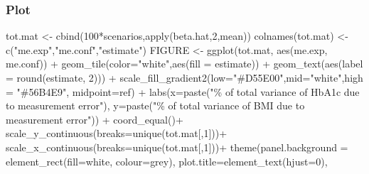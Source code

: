 \documentclass[
  letterpaper,
  DIV=11,
  numbers=noendperiod]{scrartcl}
\newenvironment{Shaded}{\begin{snugshade}}{\end{snugshade}}
\newcommand{\AttributeTok}[1]{\textcolor[rgb]{0.40,0.45,0.13}{#1}}
\newcommand{\DecValTok}[1]{\textcolor[rgb]{0.68,0.00,0.00}{#1}}
\newcommand{\FunctionTok}[1]{\textcolor[rgb]{0.28,0.35,0.67}{#1}}
\newcommand{\NormalTok}[1]{\textcolor[rgb]{0.00,0.23,0.31}{#1}}
\newcommand{\OtherTok}[1]{\textcolor[rgb]{0.00,0.23,0.31}{#1}}
\newcommand{\SpecialCharTok}[1]{\textcolor[rgb]{0.37,0.37,0.37}{#1}}
\newcommand{\StringTok}[1]{\textcolor[rgb]{0.13,0.47,0.30}{#1}}
\begin{document}
\hypertarget{plot}{%
\subsubsection{Plot}\label{plot}}

\begin{Shaded}
\begin{Highlighting}[]
\NormalTok{tot.mat }\OtherTok{\textless{}{-}} \FunctionTok{cbind}\NormalTok{(}\DecValTok{100}\SpecialCharTok{*}\NormalTok{scenarios,}\FunctionTok{apply}\NormalTok{(beta.hat,}\DecValTok{2}\NormalTok{,mean))}
\FunctionTok{colnames}\NormalTok{(tot.mat) }\OtherTok{\textless{}{-}} \FunctionTok{c}\NormalTok{(}\StringTok{"me.exp"}\NormalTok{,}\StringTok{"me.conf"}\NormalTok{,}\StringTok{"estimate"}\NormalTok{)}
\NormalTok{FIGURE }\OtherTok{\textless{}{-}} \FunctionTok{ggplot}\NormalTok{(tot.mat, }\FunctionTok{aes}\NormalTok{(me.exp, me.conf)) }\SpecialCharTok{+}
  \FunctionTok{geom\_tile}\NormalTok{(}\AttributeTok{color=}\StringTok{"white"}\NormalTok{,}\FunctionTok{aes}\NormalTok{(}\AttributeTok{fill =}\NormalTok{ estimate)) }\SpecialCharTok{+}
  \FunctionTok{geom\_text}\NormalTok{(}\FunctionTok{aes}\NormalTok{(}\AttributeTok{label =} \FunctionTok{round}\NormalTok{(estimate, }\DecValTok{2}\NormalTok{))) }\SpecialCharTok{+}
  \FunctionTok{scale\_fill\_gradient2}\NormalTok{(}\AttributeTok{low=}\StringTok{"\#D55E00"}\NormalTok{,}\AttributeTok{mid=}\StringTok{"white"}\NormalTok{,}\AttributeTok{high =} \StringTok{"\#56B4E9"}\NormalTok{, }\AttributeTok{midpoint=}\NormalTok{ref) }\SpecialCharTok{+}
  \FunctionTok{labs}\NormalTok{(}\AttributeTok{x=}\FunctionTok{paste}\NormalTok{(}\StringTok{"\% of total variance of HbA1c due to measurement error"}\NormalTok{),}
       \AttributeTok{y=}\FunctionTok{paste}\NormalTok{(}\StringTok{"\% of total variance of BMI due to measurement error"}\NormalTok{)) }\SpecialCharTok{+}
  \FunctionTok{coord\_equal}\NormalTok{()}\SpecialCharTok{+}
  \FunctionTok{scale\_y\_continuous}\NormalTok{(}\AttributeTok{breaks=}\FunctionTok{unique}\NormalTok{(tot.mat[,}\DecValTok{1}\NormalTok{]))}\SpecialCharTok{+}
  \FunctionTok{scale\_x\_continuous}\NormalTok{(}\AttributeTok{breaks=}\FunctionTok{unique}\NormalTok{(tot.mat[,}\DecValTok{1}\NormalTok{]))}\SpecialCharTok{+}
  \FunctionTok{theme}\NormalTok{(}\AttributeTok{panel.background =} \FunctionTok{element\_rect}\NormalTok{(}\AttributeTok{fill=}\StringTok{\textquotesingle{}white\textquotesingle{}}\NormalTok{, }\AttributeTok{colour=}\StringTok{\textquotesingle{}grey\textquotesingle{}}\NormalTok{),}
        \AttributeTok{plot.title=}\FunctionTok{element\_text}\NormalTok{(}\AttributeTok{hjust=}\DecValTok{0}\NormalTok{),}

\end{Highlighting}
\end{Shaded}
\end{document}
